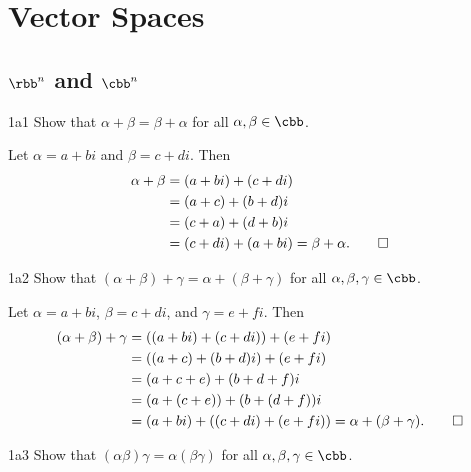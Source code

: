 \section{Vector Spaces}

\subsection{\texorpdfstring{$\rbb^n$ and $\cbb^n$}{Rn and Cn}}

\begin{exercise}{1a1}
    Show that $\alpha + \beta = \beta + \alpha$ for all $\alpha, \beta \in \cbb$.
\end{exercise}

\begin{sol}
    Let $\alpha = a + bi$ and $\beta = c + di$.
    Then
    \begin{align*}
        \alpha + \beta & = (a + bi) + (c + di) \\
        & = (a + c) + (b + d)i \\
        & = (c + a) + (d + b)i \\
        & = (c + di) + (a + bi) = \beta + \alpha. \qedhere
    \end{align*}
\end{sol}

\begin{exercise}{1a2}
    Show that $(\alpha + \beta) + \gamma = \alpha + (\beta + \gamma)$ for all $\alpha, \beta, \gamma \in \cbb$.
\end{exercise}

\begin{sol}
    Let $\alpha = a + bi$, $\beta = c + di$, and $\gamma = e + fi$.
	Then
    \begin{align*}
        (\alpha + \beta) + \gamma & = ((a + bi) + (c + di)) + (e + fi) \\
        & = ((a + c) + (b + d)i) + (e + fi) \\
        & = (a + c + e) + (b + d + f)i \\
        & = (a + (c + e)) + (b + (d + f))i \\
        & = (a + bi) + ((c + di) + (e + fi)) = \alpha + (\beta + \gamma). \qedhere
    \end{align*}
\end{sol}

\begin{exercise}{1a3}
    Show that $(\alpha\beta)\gamma = \alpha(\beta\gamma)$ for all $\alpha, \beta, \gamma \in \cbb$.
\end{exercise}


